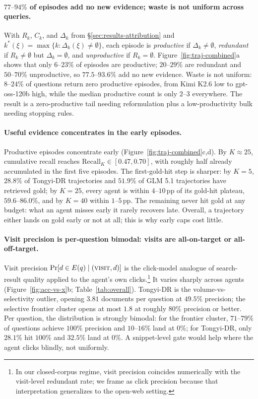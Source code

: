\paragraph{$77\text{--}94\%$ of episodes add no new evidence; waste is not uniform across queries.} With $R_k$, $C_k$, and $\Delta_k$ from §\ref{sec:results-attribution} and $k^*(\xi) = \max\{k : \Delta_k(\xi) \neq \emptyset\}$, each episode is \emph{productive} if $\Delta_k \neq \emptyset$, \emph{redundant} if $R_k \neq \emptyset$ but $\Delta_k = \emptyset$, and \emph{unproductive} if $R_k = \emptyset$. Figure~\ref{fig:traj-combined}a shows that only $6\text{--}23\%$ of episodes are productive; $20\text{--}29\%$ are redundant and $50\text{--}70\%$ unproductive, so $77.5\text{--}93.6\%$ add no new evidence. Waste is not uniform: $8\text{--}24\%$ of questions return zero productive episodes, from Kimi K2.6 low to gpt-oss-120b high, while the median productive count is only $2\text{--}3$ everywhere. The result is a zero-productive tail needing reformulation plus a low-productivity bulk needing stopping rules.

\paragraph{Useful evidence concentrates in the early episodes.} Productive episodes concentrate early (Figure~\ref{fig:traj-combined}c,d). By $K \approx 25$, cumulative recall reaches $\mathrm{Recall}_K \in [0.47, 0.70]$, with roughly half already accumulated in the first five episodes. The first-gold-hit step is sharper: by $K = 5$, $28.8\%$ of Tongyi-DR trajectories and $51.9\%$ of GLM 5.1 trajectories have retrieved gold; by $K = 25$, every agent is within $4\text{--}10$\,pp of its gold-hit plateau, $59.6\text{--}86.0\%$, and by $K = 40$ within $1\text{--}5$\,pp. The remaining never hit gold at any budget: what an agent misses early it rarely recovers late. Overall, a trajectory either lands on gold early or not at all; this is why early caps cost little.

\paragraph{Visit precision is per-question bimodal: visits are all-on-target or all-off-target.} Visit precision $\Pr[d \in E(q) \mid (\textsc{visit}, d)]$ is the click-model analogue of search-result quality applied to the agent's own clicks.\footnote{In our closed-corpus regime, visit precision coincides numerically with the visit-level redundant rate; we frame as click precision because that interpretation generalizes to the open-web setting.} It varies sharply across agents (Figure~\ref{fig:acc-vs-x}b; Table~\ref{tab:overall}). Tongyi-DR is the volume-vs-selectivity outlier, opening $3.81$ documents per question at $49.5\%$ precision; the selective frontier cluster opens at most $1.8$ at roughly $80\%$ precision or better. Per question, the distribution is strongly bimodal: for the frontier cluster, $71\text{--}79\%$ of questions achieve $100\%$ precision and $10\text{--}16\%$ land at $0\%$; for Tongyi-DR, only $28.1\%$ hit $100\%$ and $32.5\%$ land at $0\%$. A snippet-level gate would help where the agent clicks blindly, not uniformly.

